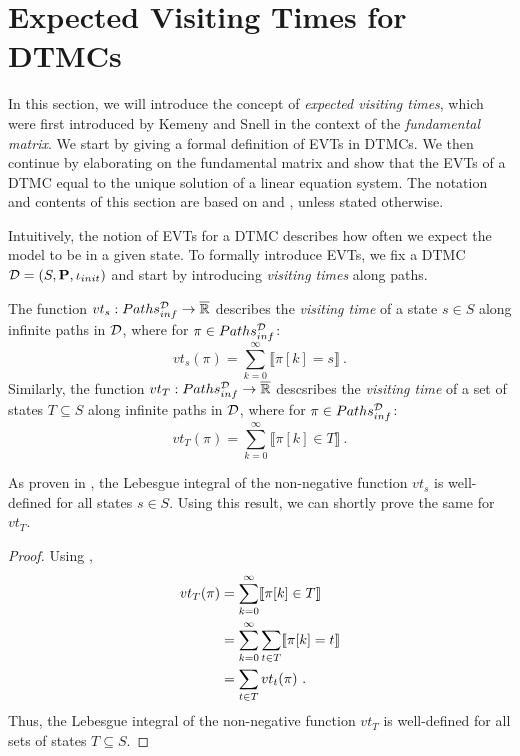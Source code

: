 \section{Expected Visiting Times for DTMCs}\label{sec:EVTs_for_DTMCs}
In this section, we will introduce the concept of \textit{expected visiting times}, which were first introduced by Kemeny and Snell \cite{KemenySnellBook} in the context of the \textit{fundamental matrix}. We start by giving a formal definition of EVTs in DTMCs. We then continue by elaborating on the fundamental matrix and show that the EVTs of a DTMC equal to the unique solution of a linear equation system.
The notation and contents of this section are based on \cite{Computing_EVTs_Stationary_Distr_in_MCs_Mertens} and \cite{KemenySnellBook}, unless stated otherwise.

Intuitively, the notion of EVTs for a DTMC describes how often we expect the model to be in a given state. To formally introduce EVTs, we fix a DTMC $\mathcal{D} = (S,\mathbf{P},\iota_{init})$ and start by introducing \textit{visiting times} along paths.
\begin{definition}\label{def:visiting_times_of_infinite_paths}
    The function $vt_s:Paths^{\mathcal{D}}_{inf} \rightarrow \overline{\mathbb{R}}$ describes the \textit{visiting time} of a state $s\in S$ along infinite paths in $\mathcal{D}$, where for $\pi\in Paths^{\mathcal{D}}_{inf}$:
    \[vt_s(\pi)=\sum_{k=0}^{\infty}\llbracket \pi[k]=s \rrbracket\ .\]
    Similarly, the function $vt_T:Paths^{\mathcal{D}}_{inf} \rightarrow \overline{\mathbb{R}}$ descsribes the \textit{visiting time} of a set of states $T\subseteq S$ along infinite paths in $\mathcal{D}$, where for $\pi \in Paths^{\mathcal{D}}_{inf}$:
    \[vt_T(\pi)=\sum_{k=0}^{\infty}\llbracket \pi[k]\in T \rrbracket\ .\]
\end{definition}
As proven in \cite{Computing_EVTs_Stationary_Distr_in_MCs_Mertens}, the Lebesgue integral of the non-negative function $vt_s$ is well-defined for all states $s\in S$. Using this result, we can shortly prove the same for $vt_T$.
\begin{proof}
    Using ,
    \begin{align}
        vt_T(\pi)
        & = \sum_{k=0}^{\infty}\llbracket \pi[k]\in T \rrbracket \notag \\
        & = \sum_{k=0}^{\infty}\sum_{t\in T}\llbracket \pi[k] = t \rrbracket \notag \\
        & = \sum_{t\in T}vt_t(\pi)\ .\notag
    \end{align}
    Thus, the Lebesgue integral of the non-negative function $vt_T$ is well-defined for all sets of states $T\subseteq S$.
\end{proof}


